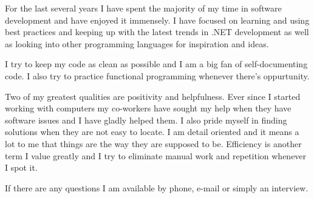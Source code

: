 \documentclass[11pt,a4paper,sans]{moderncv}
\begin{document}
{    For the last several years I have spent the majority of my time in software development and have enjoyed it immensely. I have focused on learning and using best practices and keeping up with the latest trends in .NET development as well as looking into other programming languages for inspiration and ideas.

    I try to keep my code as clean as possible and I am a big fan of self-documenting code. I also try to practice functional programming whenever there's oppurtunity.

    Two of my greatest qualities are positivity and helpfulness. Ever since I started working with computers my co-workers have sought my help when they have software issues and I have gladly helped them. I also pride myself in finding solutions when they are not easy to locate. I am detail oriented and it means a lot to me that things are the way they are supposed to be. Efficiency is another term I value greatly and I try to eliminate manual work and repetition whenever I spot it.
    
    If there are any questions I am available by phone, e-mail or simply an interview.
    
    \makeletterclosing
}
\end{document}
